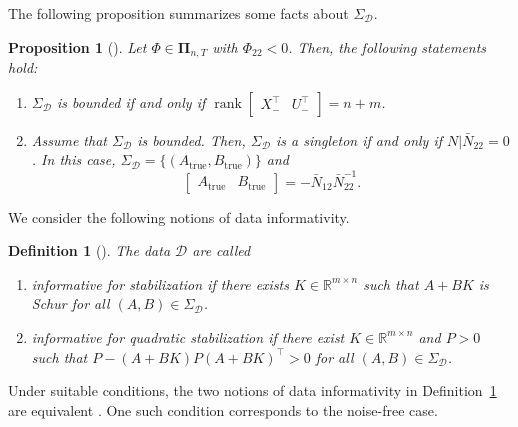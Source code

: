 \documentclass[9pt,shortpaper,twoside,web]{ieeecolor}
\DeclareMathOperator{\rank}{rank}
\newtheorem{proposition}[theorem]{Proposition}
\newtheorem{definition}[theorem]{Definition}
\begin{document}
The following proposition summarizes some facts about $\Sigma_\mathcal{D}$. 
\begin{proposition}[{\cite[Prop. 14]{shakouri2024system}}]
\label{prop:Sigma_properties}
Let $\Phi\in\pmb{\Pi}_{n,T}$ with $\Phi_{22}<0$. Then, the following statements hold:
\begin{enumerate}[label=(\alph*),ref=\ref{prop:Sigma_properties}(\alph*)]
    \item\label{prop:Sigma_properties(b)} $\Sigma_\mathcal{D}$ is bounded \emph{if and only if} $\rank\begin{bmatrix}
X_-^\top & U_-^\top
\end{bmatrix}=n+m$.    \item\label{prop:Sigma_properties(c)} Assume that $\Sigma_\mathcal{D}$ is bounded. Then, $\Sigma_\mathcal{D}$ is a singleton \emph{if and only if} $N|\bar{N}_{22}=0$.
In this case, $\Sigma_\mathcal{D}=\{(A_{\text{true}},B_{\text{true}})\}$ and
    \begin{equation}
    \begin{bmatrix} A_{\text{true}} & B_{\text{true}} \end{bmatrix}=-\bar{N}_{12}\bar{N}_{22}^{-1}.
    \end{equation}
\end{enumerate}
\end{proposition}

We consider the following notions of data informativity. 
\begin{definition}[\cite{DBLSCT2025}]
\label{def:1}
The data $\mathcal{D}$ are called 
\begin{enumerate}[label=(\alph*),ref=\ref{def:1}(\alph*)]
    \item\label{def:1(a)} \emph{informative for stabilization} if there exists $K\in\mathbb{R}^{m\times n}$ such that $A+BK$ is Schur for all $(A,B)\in\Sigma_\mathcal{D}$.
    \item\label{def:1(b)} \emph{informative for quadratic stabilization} if there exist \mbox{$K\in\mathbb{R}^{m\times n}$} and $P>0$ such that $P-(A+BK) P(A+BK)^\top>0$ for all $(A,B)\in\Sigma_\mathcal{D}$.
\end{enumerate}
\end{definition}

Under suitable conditions, the two notions of data informativity in Definition~\ref{def:1} are equivalent \cite{van2022data}. One such condition corresponds to the noise-free case.
\end{document}
